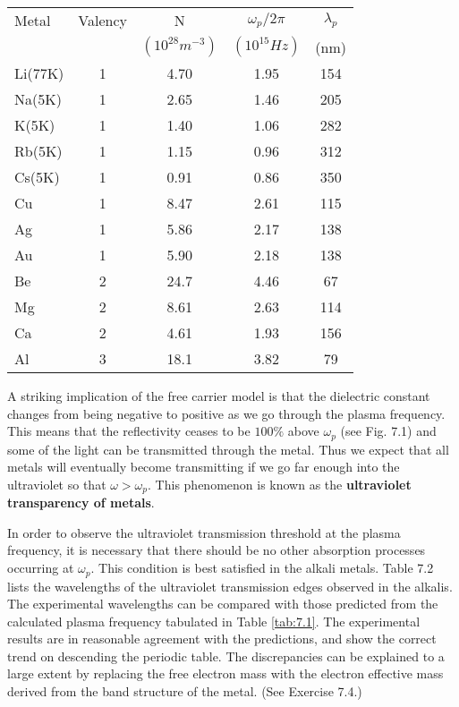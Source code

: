 \documentclass[12pt]{book}
\begin{document}
\begin{table}
  \begin{tabular}{lcccc}

     Metal & Valency & N & $\omega_p/2\pi$ & $\lambda_p$ \\
       &  & $(10^{28}m^{-3})$ & $(10^{15}Hz)$ & (nm) \\
     Li(77K) & 1 & 4.70 & 1.95 & 154 \\
     Na(5K) & 1 & 2.65 & 1.46 & 205 \\
     K(5K) & 1 & 1.40 & 1.06 & 282 \\
     Rb(5K) & 1 & 1.15 & 0.96 & 312 \\
     Cs(5K) & 1 & 0.91 & 0.86 & 350 \\
     Cu & 1 & 8.47 & 2.61 & 115 \\
     Ag & 1 & 5.86 & 2.17 & 138 \\
     Au & 1 & 5.90 & 2.18 & 138 \\
     Be & 2 & 24.7 & 4.46 & 67 \\
     Mg & 2 & 8.61 & 2.63 & 114 \\
     Ca & 2 & 4.61 & 1.93 & 156 \\
     Al & 3 & 18.1 & 3.82 & 79 \\

   \end{tabular}
\end{table}

A striking implication of the free carrier model is that the dielectric constant changes from being negative to positive as we go through the plasma frequency. This means that the reflectivity ceases to be $100\%$ above $\omega_p$ (see Fig. 7.1) and some of the light can be transmitted through the metal. Thus we expect that all metals will eventually become transmitting if we go far enough into the ultraviolet so that $\omega>\omega_p$. This phenomenon is known as the \textbf{ultraviolet transparency of metals}.

In order to observe the ultraviolet transmission threshold at  the plasma frequency, it is necessary that there should be no other absorption processes occurring at $\omega_p$. This condition is best satisfied in the alkali metals. Table 7.2 lists the wavelengths of the ultraviolet transmission edges observed in the alkalis. The experimental wavelengths can be compared with those predicted from the calculated plasma frequency tabulated in Table \ref{tab:7.1}. The experimental results are in reasonable agreement with the predictions, and show the correct trend on descending the periodic table. The discrepancies can be explained to a large extent by replacing the free electron mass with the electron effective mass derived from the band structure of the metal. (See Exercise 7.4.)
\end{document}
